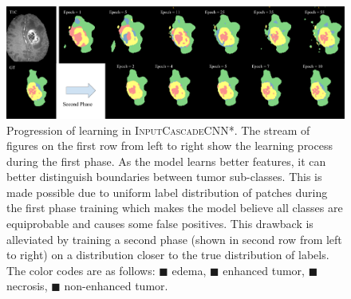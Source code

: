 \documentclass[final,5p,times,twocolumn]{elsarticle}
\begin{document}
\begin{figure}[]
\centering

\includegraphics[width=\linewidth]{scheduled_predictions.pdf}

\caption{Progression of learning in \textsc{InputCascadeCNN*}. The stream of figures on the first row from left to right show the learning process during the first phase. As the model learns better features, it can better distinguish boundaries between tumor sub-classes. This is made possible due to uniform label distribution of patches during the first phase training which makes the model believe all classes are equiprobable and causes some false positives. This drawback is alleviated by training a second phase (shown in second row from left to right) on a distribution closer to the true distribution of labels. The color codes are as follows:  \textcolor[RGB]{135,213,120}{$\blacksquare$} edema, \textcolor[RGB]{225,225,95}{$\blacksquare$} enhanced tumor,
\textcolor[RGB]{246,145,139}{$\blacksquare$} necrosis,
\textcolor[RGB]{124,167,208}{$\blacksquare$} non-enhanced tumor.}
\label{fig:scheduled_prediction}
\end{figure} 
\end{document}
